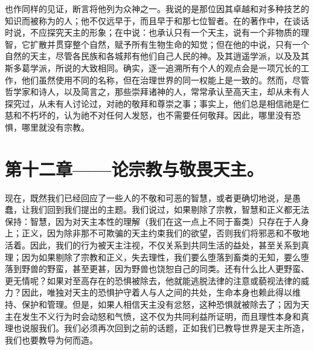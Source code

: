 也作同样的见证，断言将他列为众神之一。我说的是那位因其卓越和对多种技艺的知识而被称为的人；他不仅远早于，而且早于和那七位智者。在的著作中，在谈话时说，不应探究天主的形象；在中说：也承认只有一个天主，说有一个非物质的理智，它扩散并贯穿整个自然，赋予所有生物生命的知觉；但在他的中说，只有一个自然的天主，尽管各民族和各城邦有他们自己人民的神。及其逍遥学派，以及及其斯多葛学派，所说的大致相同。确实，逐一追溯所有个人的观点会是一项冗长的工作，他们虽然使用不同的名称，但在治理世界的同一权能上是一致的。然而，尽管哲学家和诗人，以及简言之，那些崇拜诸神的人，常常承认至高天主，却从未有人探究过，从未有人讨论过，对祂的敬拜和尊崇之事；事实上，他们总是相信祂是仁慈和不朽坏的，认为祂不对任何人发怒，也不需要任何敬拜。因此，哪里没有恐惧，哪里就没有宗教。\par


\section{第十二章——论宗教与敬畏天主。}

现在，既然我们已经回应了一些人的不敬和可恶的智慧，或者更确切地说，是愚蠢，让我们回到我们提出的主题。我们说过，如果剔除了宗教，智慧和正义都无法保持：智慧，因为对天主本性的理解（我们在这一点上不同于畜类）只存在于人身上；正义，因为除非那不可欺骗的天主约束我们的欲望，否则我们将邪恶和不敬地活着。因此，我们的行为被天主注视，不仅关系到共同生活的益处，甚至关系到真理；因为如果剔除了宗教和正义，失去理性，我们要么堕落到畜类的无知，要么堕落到野兽的野蛮，甚至更甚，因为野兽也饶恕自己的同类。还有什么比人更野蛮、更无情呢？如果对至高存在的恐惧被除去，他就能逃脱法律的注意或藐视法律的威力？因此，唯独对天主的恐惧护守着人与人之间的共处，生命本身也赖此得以维持、保护和管理。但是，如果人相信天主没有忿怒，这种恐惧就被除去了；因为天主在发生不义行为时会动怒和气愤，这不仅为共同利益所证明，而且理性本身和真理也说服我们。我们必须再次回到之前的话题，正如我们已教导世界是天主所造，我们也要教导为何而造。\par


